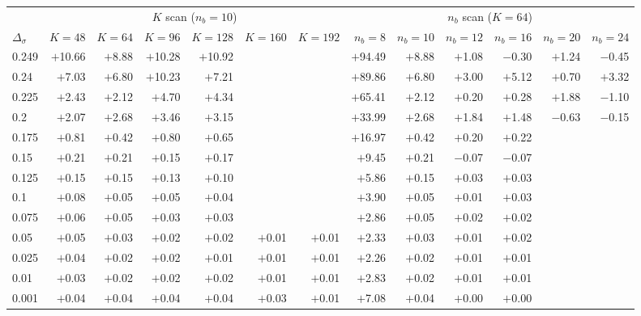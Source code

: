 \begin{tabular}{lrrrrrrrrrrrr}
\toprule
 & \multicolumn{6}{c}{$K$ scan ($n_b=10$)} & \multicolumn{6}{c}{$n_b$ scan ($K=64$)}\\
\cmidrule(lr){2-7}\cmidrule(lr){8-13}
$\Delta_\sigma$ & $K{=}48$ & $K{=}64$ & $K{=}96$ & $K{=}128$ & $K{=}160$ & $K{=}192$ & $n_b{=}8$ & $n_b{=}10$ & $n_b{=}12$ & $n_b{=}16$ & $n_b{=}20$ & $n_b{=}24$\\
\midrule
0.249 & $+$10.66 & $+$8.88 & $+$10.28 & $+$10.92 &  &  & $+$94.49 & $+$8.88 & $+$1.08 & $-$0.30 & $+$1.24 & $-$0.45\\
0.24 & $+$7.03 & $+$6.80 & $+$10.23 & $+$7.21 &  &  & $+$89.86 & $+$6.80 & $+$3.00 & $+$5.12 & $+$0.70 & $+$3.32\\
0.225 & $+$2.43 & $+$2.12 & $+$4.70 & $+$4.34 &  &  & $+$65.41 & $+$2.12 & $+$0.20 & $+$0.28 & $+$1.88 & $-$1.10\\
0.2 & $+$2.07 & $+$2.68 & $+$3.46 & $+$3.15 &  &  & $+$33.99 & $+$2.68 & $+$1.84 & $+$1.48 & $-$0.63 & $-$0.15\\
0.175 & $+$0.81 & $+$0.42 & $+$0.80 & $+$0.65 &  &  & $+$16.97 & $+$0.42 & $+$0.20 & $+$0.22 &  & \\
0.15 & $+$0.21 & $+$0.21 & $+$0.15 & $+$0.17 &  &  & $+$9.45 & $+$0.21 & $-$0.07 & $-$0.07 &  & \\
0.125 & $+$0.15 & $+$0.15 & $+$0.13 & $+$0.10 &  &  & $+$5.86 & $+$0.15 & $+$0.03 & $+$0.03 &  & \\
0.1 & $+$0.08 & $+$0.05 & $+$0.05 & $+$0.04 &  &  & $+$3.90 & $+$0.05 & $+$0.01 & $+$0.03 &  & \\
0.075 & $+$0.06 & $+$0.05 & $+$0.03 & $+$0.03 &  &  & $+$2.86 & $+$0.05 & $+$0.02 & $+$0.02 &  & \\
0.05 & $+$0.05 & $+$0.03 & $+$0.02 & $+$0.02 & $+$0.01 & $+$0.01 & $+$2.33 & $+$0.03 & $+$0.01 & $+$0.02 &  & \\
0.025 & $+$0.04 & $+$0.02 & $+$0.02 & $+$0.01 & $+$0.01 & $+$0.01 & $+$2.26 & $+$0.02 & $+$0.01 & $+$0.01 &  & \\
0.01 & $+$0.03 & $+$0.02 & $+$0.02 & $+$0.02 & $+$0.01 & $+$0.01 & $+$2.83 & $+$0.02 & $+$0.01 & $+$0.01 &  & \\
0.001 & $+$0.04 & $+$0.04 & $+$0.04 & $+$0.04 & $+$0.03 & $+$0.01 & $+$7.08 & $+$0.04 & $+$0.00 & $+$0.00 &  & \\
\bottomrule
\end{tabular}
